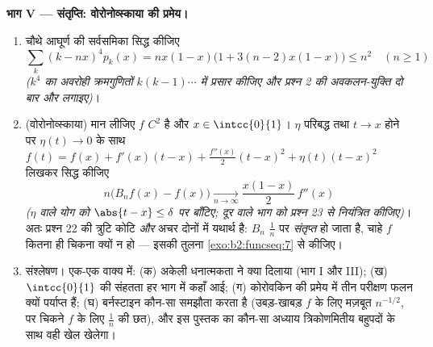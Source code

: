 \begin{problem}
\medskip
\noindent\textbf{भाग V --- संतृप्ति: वोरोनोव्स्काया की प्रमेय।}
\begin{enumerate}[resume]
  \item चौथे आघूर्ण की सर्वसमिका सिद्ध कीजिए
        \[
        \sum_k (k - nx)^4 p_k(x)
        = nx(1-x)\bigl(1 + 3(n-2)x(1-x)\bigr) \leq n^2
        \quad (n \geq 1)
        \]
        \emph{($k^4$ का अवरोही क्रमगुणितों $k(k-1)\cdots$ में प्रसार कीजिए और प्रश्न
        2 की अवकलन-युक्ति दो बार और लगाइए)}।
  \item (वोरोनोव्स्काया) मान लीजिए $f$ $C^2$ है और $x \in
        \intcc{0}{1}$। $\eta$ परिबद्ध तथा
        $t \to x$ होने पर $\eta(t) \to 0$ के साथ $f(t) = f(x) + f'(x)(t-x) +
        \frac{f''(x)}2(t-x)^2 + \eta(t)(t-x)^2$ लिखकर सिद्ध कीजिए
        \[
        n\bigl(B_nf(x) - f(x)\bigr)
        \xrightarrow[n\to\infty]{}
        \frac{x(1-x)}{2}\,f''(x)
        \]
        \emph{($\eta$ वाले योग को $\abs{t - x} \leq
        \delta$ पर बाँटिए; दूर वाले भाग को प्रश्न
        23 से नियंत्रित कीजिए)}। अतः प्रश्न 22 की त्रुटि कोटि \emph{और}
        अचर दोनों में यथार्थ है: $B_n$ $\frac1n$ पर \emph{संतृप्त} हो जाता है,
        चाहे $f$ कितना ही चिकना क्यों न हो --- इसकी तुलना \cref{exo:b2:funcseq:7} से
        कीजिए।
  \item संश्लेषण। एक-एक वाक्य में: (क) अकेली धनात्मकता ने क्या दिलाया
        (भाग I और III); (ख) $\intcc{0}{1}$ की संहतता हर भाग में कहाँ आई; (ग)
        कोरोवकिन की प्रमेय में तीन परीक्षण फलन क्यों पर्याप्त हैं; (घ)
        बर्नस्टाइन कौन-सा समझौता करता है (उबड़-खाबड़ $f$ के लिए मज़बूत
        $n^{-1/2}$, पर चिकने $f$ के लिए $\frac1n$ की छत), और इस पुस्तक का कौन-सा
        अध्याय त्रिकोणमितीय बहुपदों के साथ वही खेल खेलेगा।
\end{enumerate}
\end{problem}
